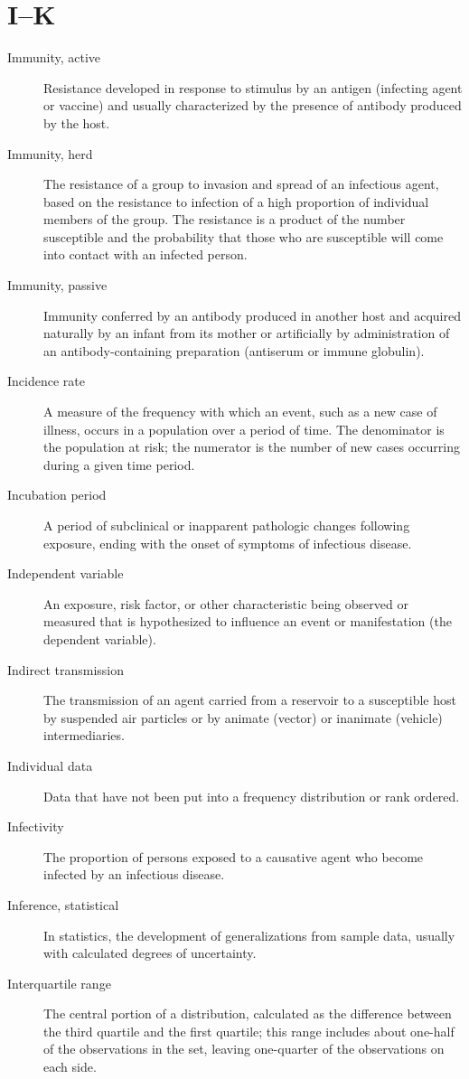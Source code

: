 \documentclass[11pt]{article}
\begin{document}
\section*{I--K}

\begin{description}
\item[Immunity, active] Resistance developed in response to
stimulus by an antigen (infecting agent or vaccine) and usually
characterized by the presence of antibody produced by the host.
\item[Immunity, herd] The resistance of a group to invasion and
spread of an infectious agent, based on the resistance to
infection of a high proportion of individual members of the
group. The resistance is a product of the number susceptible and
the probability that those who are susceptible will come into
contact with an infected person.
\item[Immunity, passive] Immunity conferred by an antibody
produced in another host and acquired naturally by an infant
from its mother or artificially by administration of an
antibody-containing preparation (antiserum or immune globulin).
\item[Incidence rate] A measure of the frequency with which an
event, such as a new case of illness, occurs in a population over
a period of time. The denominator is the population at risk; the
numerator is the number of new cases occurring during a given
time period.
\item[Incubation period] A period of subclinical or inapparent
pathologic changes following exposure, ending with the onset of
symptoms of infectious disease.
\item[Independent variable] An exposure, risk factor, or other
characteristic being observed or measured that is hypothesized
to influence an event or manifestation (the dependent variable).
\item[Indirect transmission] The transmission of an agent carried
from a reservoir to a susceptible host by suspended air particles
or by animate (vector) or inanimate (vehicle) intermediaries.
\item[Individual data] Data that have not been put into a
frequency distribution or rank ordered.
\item[Infectivity] The proportion of persons exposed to a
causative agent who become infected by an infectious disease.
\item[Inference, statistical] In statistics, the development of
generalizations from sample data, usually with calculated degrees
of uncertainty.
\item[Interquartile range] The central portion of a distribution,
calculated as the difference between the third quartile and the
first quartile; this range includes about one-half of the
observations in the set, leaving one-quarter of the observations
on each side.
\end{description}
\end{document}
